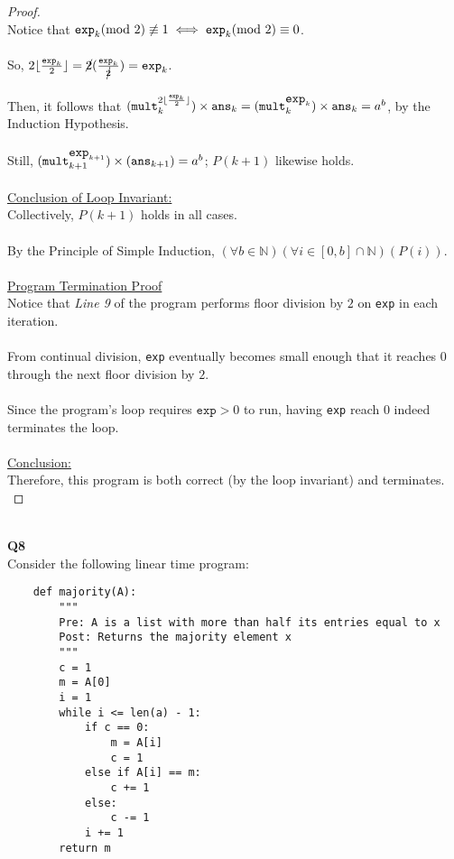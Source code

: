 \documentclass[12pt]{article}
\begin{document}
\begin{proof}
    \\
    Notice that \(\verb|exp|_k (\text{mod } 2) \not\equiv 1 \iff \verb|exp|_k (\text{mod } 2) \equiv 0\). \\
    \\
    So, \(2 \lfloor \frac{\texttt{exp}_k}{2} \rfloor = \cancel{2} (\frac{\texttt{exp}_k}{\cancel{2}}) = \verb|exp|_k\). \\
    \\
    Then, it follows that \((\verb|mult|_k^{2 \lfloor \frac{\texttt{exp}_k}{2} \rfloor}) \times \verb|ans|_k = (\verb|mult|_k^{\verb|exp|_k}) \times \verb|ans|_k = a^b\), by the Induction Hypothesis. \\
    \\
    Still, \((\verb|mult|_{k + 1}^{\verb|exp|_{k + 1}}) \times (\verb|ans|_{k + 1}) = a^b\); $P(k + 1)$ likewise holds. \\
    \\
    \underline{Conclusion of Loop Invariant:} \\
    Collectively, $P(k + 1)$ holds in all cases. \\
    \\
    By the Principle of Simple Induction, $(\forall b \in \mathbb{N})(\forall i \in [0, b] \cap \mathbb{N})(P(i))$. \\
    \\
    \underline{Program Termination Proof} \\
    Notice that \textit{Line 9} of the program performs floor division by $2$ on \texttt{exp} in each iteration. \\
    \\
    From continual division, \texttt{exp} eventually becomes small enough that it reaches $0$ through the next floor division by $2$. \\
    \\
    Since the program's loop requires $\texttt{exp} > 0$ to run, having \texttt{exp} reach $0$ indeed terminates the loop. \\
    \\
    \underline{Conclusion:} \\
    Therefore, this program is both correct (by the loop invariant) and terminates. \\
\end{proof}
\leavevmode\\
\textbf{Q8} \\
Consider the following linear time program:
\begin{lstlisting}
    def majority(A):
        """
        Pre: A is a list with more than half its entries equal to x
        Post: Returns the majority element x
        """
        c = 1
        m = A[0]
        i = 1
        while i <= len(a) - 1:
            if c == 0:
                m = A[i]
                c = 1
            else if A[i] == m:
                c += 1
            else:
                c -= 1
            i += 1
        return m
\end{lstlisting}
\end{document}
